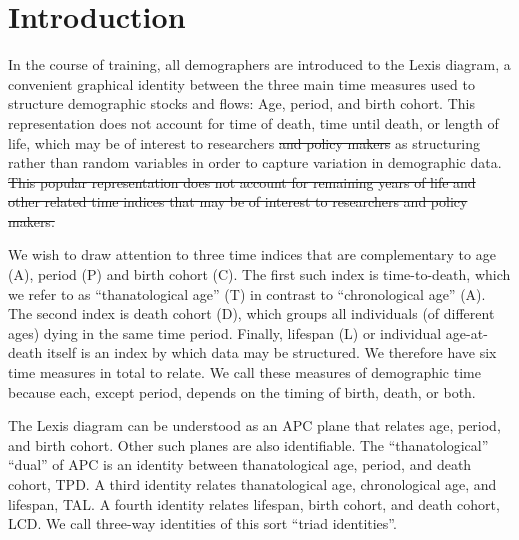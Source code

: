 \documentclass[12pt,oneside,a4paper]{article} %
\begin{document}
\section{Introduction}
In the course of training, all demographers are introduced
to the Lexis diagram, a convenient graphical identity between the three main
time measures used to structure demographic stocks and flows: Age, period, and
birth cohort. This representation does not account for time of death, time until
death, or length of life, which may be of interest to researchers \st{and
policy makers} as structuring rather than random variables in order to capture
variation in demographic data.
\st{This popular representation does not account for remaining years of life and other related time indices that may be of interest to researchers and
policy makers.} %

We wish to draw attention to three time indices that are complementary to age
(A), period (P) and birth cohort (C). The first such index is time-to-death,
which we refer to as ``thanatological age'' (T) in contrast to ``chronological
age'' (A). The second index is death cohort (D), which groups all individuals
(of different ages) dying in the same time period. Finally, lifespan (L) or
individual age-at-death itself is an index by which data may be structured.
We therefore have six time measures in total to relate. We call these measures of demographic
time because each, except period, depends on the timing of birth, death, or
both.

The Lexis diagram can be understood as an APC plane
that relates age, period, and birth cohort. Other such planes are
also identifiable.
The ``thanatological'' ``dual'' of APC is an identity between thanatological
age, period, and death cohort, TPD. A third identity relates thanatological age,
chronological age, and lifespan, TAL. A fourth identity relates lifespan, birth
cohort, and death cohort, LCD. We call three-way identities of this sort ``triad identities''.
\end{document}
